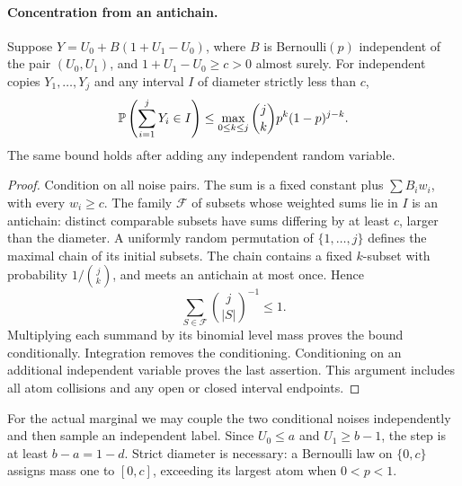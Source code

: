 \paragraph{Concentration from an antichain.}
\begin{lemma}
Suppose $Y=U_0+B(1+U_1-U_0)$, where $B$ is Bernoulli$(p)$ independent
of the pair $(U_0,U_1)$, and $1+U_1-U_0\ge c>0$ almost surely.
For independent copies $Y_1,\ldots,Y_j$ and any interval $I$ of diameter
strictly less than $c$,
\[
 \mathbb P\left(\sum_{i=1}^jY_i\in I\right)
 \le \max_{0\le k\le j}\binom jk p^k(1-p)^{j-k}.
\]
The same bound holds after adding any independent random variable.
\end{lemma}
\begin{proof}
Condition on all noise pairs. The sum is a fixed constant plus
$\sum B_iw_i$, with every $w_i\ge c$. The family $\mathcal F$ of subsets
whose weighted sums lie in $I$ is an antichain: distinct comparable
subsets have sums differing by at least $c$, larger than the diameter.
A uniformly random permutation of $\{1,\ldots,j\}$ defines the maximal
chain of its initial subsets. The chain contains a fixed $k$-subset with
probability $1/\binom jk$, and meets an antichain at most once. Hence
\[
 \sum_{S\in\mathcal F}\binom j{|S|}^{-1}\le1.
\]
Multiplying each summand by its binomial level mass proves the bound
conditionally. Integration removes the conditioning. Conditioning on an
additional independent variable proves the last assertion. This argument
includes all atom collisions and any open or closed interval endpoints.
\end{proof}
For the actual marginal we may couple the two conditional noises
independently and then sample an independent label. Since $U_0\le a$ and
$U_1\ge b-1$, the step is at least $b-a=1-d$.
Strict diameter is necessary: a Bernoulli law on $\{0,c\}$ assigns mass
one to $[0,c]$, exceeding its largest atom when $0<p<1$.

